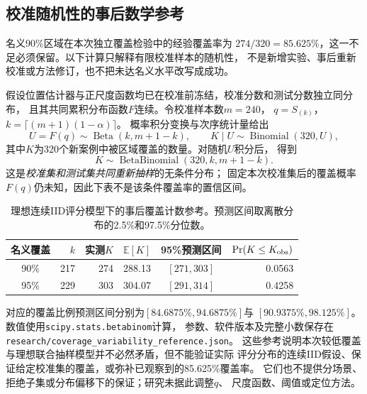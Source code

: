 \subsection{校准随机性的事后数学参考}
\label{sec:coverage-variability-reference}

名义90\%区域在本次独立覆盖检验中的经验覆盖率为
$274/320=85.625\%$，这一不足必须保留。以下计算只解释有限校准样本的随机性，
不是新增实验、事后重新校准或方法修订，也不把未达名义水平改写成成功。

假设位置估计器与正尺度函数均已在校准前冻结，校准分数和测试分数独立同分布，
且其共同累积分布函数$F$连续。令校准样本数$m=240$，
$q=S_{(k)}$，$k=\lceil(m+1)(1-\alpha)\rceil$。
概率积分变换与次序统计量给出
\[
 U=F(q)\sim\operatorname{Beta}(k,m+1-k),\qquad
 K\mid U\sim\operatorname{Binomial}(320,U),
\]
其中$K$为320个新案例中被区域覆盖的数量。对随机$U$积分后，
得到
\[
 K\sim\operatorname{BetaBinomial}(320,k,m+1-k).
\]
这是\emph{校准集和测试集共同重新抽样}的无条件分布；
固定本次校准集后的覆盖概率$F(q)$仍未知，因此下表不是该条件覆盖率的置信区间。

\begin{table}[H]
\centering\small
\caption{理想连续IID评分模型下的事后覆盖计数参考。预测区间取离散分布的2.5\%和97.5\%分位数。}
\label{tab:coverage-variability-reference}
\begin{tabular}{@{}crrrcr@{}}
\toprule
名义覆盖 & $k$ & 实测$K$ & $\mathbb{E}[K]$ & 95\%预测区间 & $\Pr(K\le K_{\rm obs})$\\
\midrule
90\% & 217 & 274 & 288.13 & $[271,303]$ & 0.0563\\
95\% & 229 & 303 & 304.07 & $[291,314]$ & 0.4258\\
\bottomrule
\end{tabular}
\end{table}

对应的覆盖比例预测区间分别为$[84.6875\%,94.6875\%]$与
$[90.9375\%,98.125\%]$。数值使用\texttt{scipy.stats.betabinom}计算，
参数、软件版本及完整小数保存在
\nolinkurl{research/coverage_variability_reference.json}。
这些参考说明本次较低覆盖与理想联合抽样模型并不必然矛盾，但不能验证实际
评分分布的连续IID假设、保证给定校准集的覆盖，或弥补已观察到的85.625\%覆盖率。
它们也不提供分场景、拒绝子集或分布偏移下的保证；研究未据此调整$q$、
尺度函数、阈值或定位方法。
